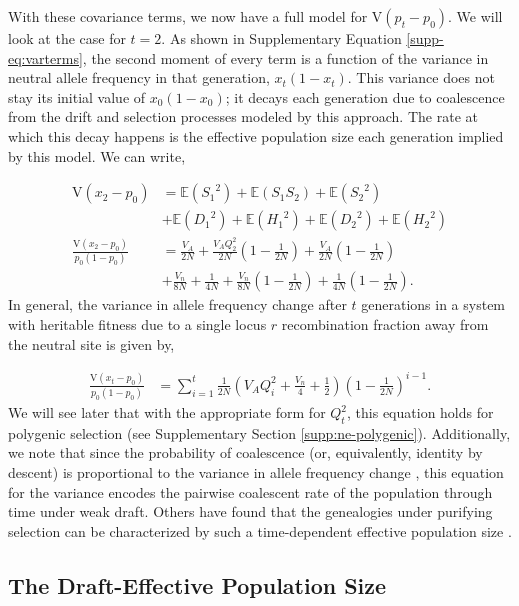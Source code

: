 \documentclass[11pt]{article}
\newcommand{\E}{\mathbb{E}}
\newcommand{\V}{\text{V}}
\begin{document}
With these covariance terms, we now have a full model for $\V(p_t - p_0)$. We
will look at the case for $t=2$. As shown in Supplementary Equation \eqref{supp-eq:varterms},
the second moment of every term is a function of the variance in neutral allele
frequency in that generation, $x_t(1-x_t)$. This variance does not stay its
initial value of $x_0(1-x_0)$; it decays each generation due to coalescence
from the drift and selection processes modeled by this approach. The rate at
which this decay happens is the effective population size each generation
implied by this model. We can write,

\begin{align}
    \label{eq:vardecay}
  \V(x_2 - p_0) &= \E({S_1}^2) + \E(S_1 S_2) + \E({S_2}^2) \nonumber \\
                  & + \E({D_1}^2) + \E({H_1}^2) + \E({D_2}^2) + \E({H_2}^2) \nonumber \\
  \frac{\V(x_2 - p_0)}{p_0(1-p_0)} &= \frac{V_A}{2N} + \frac{V_A Q_2^2}{2N}\left(1-\frac{1}{2N}\right)  +  \frac{V_A}{2N}  \left(1-\frac{1}{2N}\right)  \nonumber \\ 
                                     &+ \frac{V_n}{8N} + \frac{1}{4N} + \frac{V_n}{8N}  \left(1 - \frac{1}{2N}\right) 
+ \frac{1}{4N} \left(1 - \frac{1}{2N}\right).
\end{align}
%
In general, the variance in allele frequency change after $t$ generations in a
system with heritable fitness due to a single locus $r$ recombination fraction
away from the neutral site is given by,

\begin{align}
  \label{supp-eq:var-xt}
  \frac{\V(x_t - p_0)}{p_0(1-p_0)} &= \sum_{i=1}^t \frac{1}{2 N} \left(V_A Q_i^2 + \frac{V_n}{4} + \frac{1}{2} \right) \left(1-\frac{1}{2 N}\right)^{i-1}.
\end{align}
%
We will see later that with the appropriate form for $Q_t^2$, this equation
holds for polygenic selection (see Supplementary Section
\ref{supp:ne-polygenic}). Additionally, we note that since the probability of
coalescence (or, equivalently, identity by descent) is proportional to the
variance in allele frequency change \parencite{Barton2000-zg}, this equation
for the variance encodes the pairwise coalescent rate of the population through
time under weak draft. Others have found that the genealogies under purifying
selection can be characterized by such a time-dependent effective population
size \parencite{Nicolaisen2013-gv}.


\subsection{The Draft-Effective Population Size}
\end{document}
